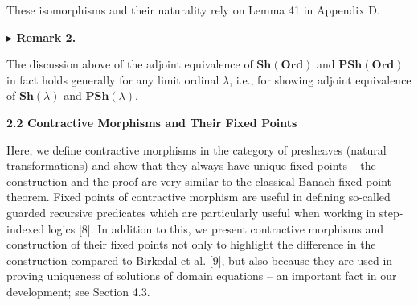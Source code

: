 \documentclass[10pt,a4paper]{article}
\begin{document}
\begin{center}\end{center}
 
These isomorphisms and their naturality rely on Lemma 41 in Appendix D.\par
 
 
 
\par\medskip\noindent\textbf{$\blacktriangleright$ Remark 2.}\par
 
 
The discussion above of the adjoint equivalence of $\mathbf{Sh}(\mathbf{Ord})$ and $\mathbf{PSh}(\mathbf{Ord})$ in fact holds generally for any limit ordinal $\lambda$, i.e., for showing adjoint equivalence of $\mathbf{Sh}(\lambda)$ and $\mathbf{PSh}(\lambda)$.\par
 
 
 
 
 
\par\medskip\noindent\textbf{2.2 Contractive Morphisms and Their Fixed Points}\par
 
 
Here, we define contractive morphisms in the category of presheaves (natural transformations) and show that they always have unique fixed points – the construction and the proof are very similar to the classical Banach fixed point theorem. Fixed points of contractive morphism are useful in defining so-called guarded recursive predicates which are particularly useful when working in step-indexed logics [8]. In addition to this, we present contractive morphisms and construction of their fixed points not only to highlight the difference in the construction compared to Birkedal et al. [9], but also because they are used in proving uniqueness of solutions of domain equations – an important fact in our development; see Section 4.3.\par
 
\end{document}
